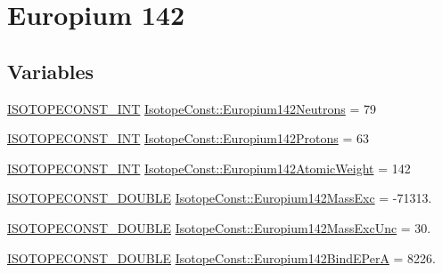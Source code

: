 \hypertarget{group___isotope_const-_europium-_eu142}{}\section{Europium 142}
\label{group___isotope_const-_europium-_eu142}
\subsection*{Variables}
\begin{DoxyCompactItemize}
\item 
\mbox{\hyperlink{group___isotope_const-_macros_ga5f18360b3e99483a35c32d789e62621c}{I\+S\+O\+T\+O\+P\+E\+C\+O\+N\+S\+T\+\_\+\+I\+NT}} \mbox{\hyperlink{group___isotope_const-_europium-_eu142_gaae2d54c3364031b3f31add79a14a009b}{Isotope\+Const\+::\+Europium142\+Neutrons}} = 79
\item 
\mbox{\hyperlink{group___isotope_const-_macros_ga5f18360b3e99483a35c32d789e62621c}{I\+S\+O\+T\+O\+P\+E\+C\+O\+N\+S\+T\+\_\+\+I\+NT}} \mbox{\hyperlink{group___isotope_const-_europium-_eu142_ga305a0d1ac1489b83c707d825094afccd}{Isotope\+Const\+::\+Europium142\+Protons}} = 63
\item 
\mbox{\hyperlink{group___isotope_const-_macros_ga5f18360b3e99483a35c32d789e62621c}{I\+S\+O\+T\+O\+P\+E\+C\+O\+N\+S\+T\+\_\+\+I\+NT}} \mbox{\hyperlink{group___isotope_const-_europium-_eu142_ga86106d6a46dceef58f7110298a46e142}{Isotope\+Const\+::\+Europium142\+Atomic\+Weight}} = 142
\item 
\mbox{\hyperlink{group___isotope_const-_macros_ga8f45a7272ce02c0b4c65c44636ed719a}{I\+S\+O\+T\+O\+P\+E\+C\+O\+N\+S\+T\+\_\+\+D\+O\+U\+B\+LE}} \mbox{\hyperlink{group___isotope_const-_europium-_eu142_ga39f5b39ba1369d37ac1176b0777d9b10}{Isotope\+Const\+::\+Europium142\+Mass\+Exc}} = -\/71313.
\item 
\mbox{\hyperlink{group___isotope_const-_macros_ga8f45a7272ce02c0b4c65c44636ed719a}{I\+S\+O\+T\+O\+P\+E\+C\+O\+N\+S\+T\+\_\+\+D\+O\+U\+B\+LE}} \mbox{\hyperlink{group___isotope_const-_europium-_eu142_ga1e5456add7043cd37eb1a8893b965710}{Isotope\+Const\+::\+Europium142\+Mass\+Exc\+Unc}} = 30.
\item 
\mbox{\hyperlink{group___isotope_const-_macros_ga8f45a7272ce02c0b4c65c44636ed719a}{I\+S\+O\+T\+O\+P\+E\+C\+O\+N\+S\+T\+\_\+\+D\+O\+U\+B\+LE}} \mbox{\hyperlink{group___isotope_const-_europium-_eu142_ga02055365030ecb4e028ccd3c394f8ca9}{Isotope\+Const\+::\+Europium142\+Bind\+E\+PerA}} = 8226.
\item 

\end{DoxyCompactItemize}

